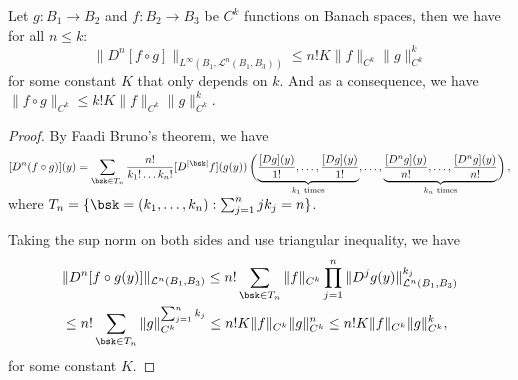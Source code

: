 \begin{lemma}\label{lemma:faaibrunoSimplified}
Let $g:B_1\rightarrow B_2$ and $f: B_2\rightarrow B_3$ be $C^k$ functions on Banach spaces, then we have for all $n \leq k$:
$$\|D^n[f\circ g]\|_{L^\infty(B_1, \mathcal{L}^n(B_1, B_3))} \leq n!K\|f\|_{C^k}\|g\|_{C^k}^k$$ for some constant $K$ that only depends on $k$. And as a consequence, we have $\|f\circ g\|_{C^k} \leq k!K\|f\|_{C^k}\|g\|_{C^k}^k$.
\end{lemma}
\begin{proof}
By Faadi Bruno's theorem, we have
$$[D^n(f\circ g)](y) = \sum_{\bsk\in T_n}\frac{n!}{k_1!\ldots k_n!}[D^{|\bsk|}f](g(y)) \left(\smash[b]{\underbrace{\frac{[Dg](y)}{1!},\ldots, \frac{[Dg](y)}{1!}}_\text{$k_1$ times}},\ldots,\smash[b]{\underbrace{\frac{[D^{n}g](y)}{n!},\ldots, \frac{[D^{n}g](y)}{n!}}_\text{$k_n$ times}}\right),$$ where $T_n = \{\bsk = (k_1,\ldots,k_n) : \sum_{j=1}^n jk_j = n\}$. 

Taking the sup norm on both sides and use triangular inequality, we have 
\begin{align*}
&\|D^n [f\circ g(y)]\|_{\mathcal{L}^n(B_1, B_3)} \leq n!\sum_{\bsk\in T_n} \|f\|_{C^k}\prod_{j=1}^n\|D^jg(y)\|_{\mathcal{L}^n(B_1, B_3)}^{k_j}   \\
&\leq n!\sum_{\bsk\in T_n} \|g\|_{C^k}^{\sum_{j=1}^nk_j}
\leq n!K\|f\|_{C^k}\|g\|_{C^k}^n 
\leq n!K\|f\|_{C^k}\|g\|_{C^k}^k, \\
\end{align*}
for some constant $K$. 

\end{proof}



